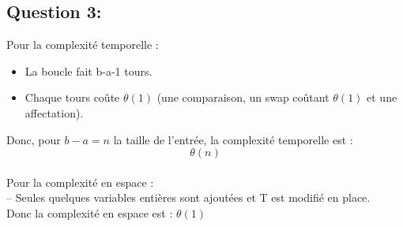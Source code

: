 \documentclass{article}
\begin{document}
\subsection*{Question 3:}
Pour la complexité temporelle : 
\begin{itemize}
    \item La boucle fait b-a-1 tours. 
    \item Chaque tours coûte $\theta(1)$ (une comparaison, un swap coûtant $\theta(1)$ et une affectation).
\end{itemize}
Donc, pour $b-a=n$ la taille de l'entrée, la complexité temporelle est : 
\[\theta(n)\]
\\
Pour la complexité en espace :
\\ 
\qquad -- Seules quelques variables entières sont ajoutées et T est modifié en place. 
\\
Donc la complexité en espace est : $\theta(1)$
\end{document}
